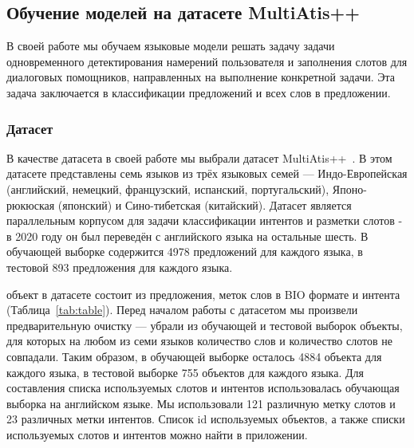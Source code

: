 \subsection{Обучение моделей на датасете MultiAtis++}
В своей работе мы обучаем языковые модели решать задачу задачи одновременного детектирования намерений пользователя и заполнения слотов для диалоговых помощников, направленных на выполнение конкретной задачи.
Эта задача заключается в классификации предложений и всех слов в предложении.

\subsubsection{Датасет}
В качестве датасета в своей работе мы выбрали датасет MultiAtis++~\cite{Xu2020EndtoEndSA}.
В этом датасете представлены семь языков из трёх языковых семей —
Индо-Европейская (английский, немецкий, французский, испанский, португальский), Японо-рюкюская (японский) и Сино-тибетская (китайский).
Датасет является параллельным корпусом для задачи классификации интентов и разметки слотов - в 2020 году он был переведён с английского языка на остальные шесть.
В обучающей выборке содержится 4978 предложений для каждого языка, в тестовой 893 предложения для каждого языка.

\begin{table}[H]
    \caption{Пример объекта из датасета MultiAtis++. На примере представлен объект на английском и немецком языке.}\label{tab:table}
\end{table}

 объект в датасете состоит из предложения, меток слов в BIO формате и интента (Таблица~\eqref{tab:table}).
Перед началом работы с датасетом мы произвели предварительную очистку —
убрали из обучающей и тестовой выборок объекты, для которых на любом из семи языков количество слов и количество слотов не совпадали.
Таким образом, в обучающей выборке осталось 4884 объекта для каждого языка, в тестовой выборке 755 объектов для каждого языка.
Для составления списка используемых слотов и интентов использовалась обучающая выборка на английском языке.
Мы использовали 121 различную метку слотов и 23 различных метки интентов.
Список id используемых объектов, а также списки используемых слотов и интентов можно найти в приложении.

